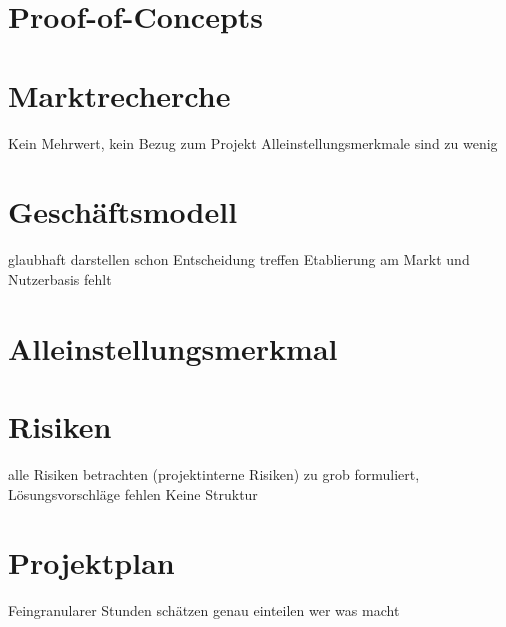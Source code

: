 \documentclass[12pt]{report}
\begin{document}

\chapter{Proof-of-Concepts}


\chapter{Marktrecherche}

Kein Mehrwert, kein Bezug zum Projekt
Alleinstellungsmerkmale sind zu wenig


\chapter{Geschäftsmodell}

glaubhaft darstellen
schon Entscheidung treffen
Etablierung am Markt und Nutzerbasis fehlt


\chapter{Alleinstellungsmerkmal}


\chapter{Risiken}

alle Risiken betrachten (projektinterne Risiken)
zu grob formuliert, Lösungsvorschläge fehlen
Keine Struktur


\chapter{Projektplan}

Feingranularer
Stunden schätzen
genau einteilen wer was macht

\end{document}
